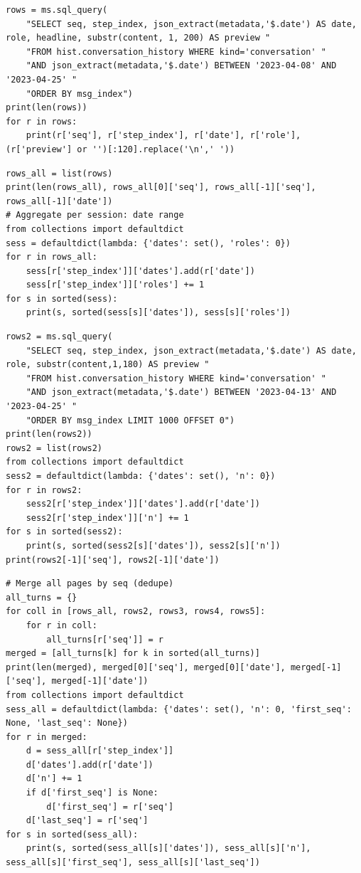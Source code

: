 \begin{lstlisting}[style=scroll, caption={Summarization: date-range SQL over event metadata (2023-04-08 to 2023-04-25).}, label={lst:sum-c0}]
rows = ms.sql_query(
    "SELECT seq, step_index, json_extract(metadata,'$.date') AS date, role, headline, substr(content, 1, 200) AS preview "
    "FROM hist.conversation_history WHERE kind='conversation' "
    "AND json_extract(metadata,'$.date') BETWEEN '2023-04-08' AND '2023-04-25' "
    "ORDER BY msg_index")
print(len(rows))
for r in rows:
    print(r['seq'], r['step_index'], r['date'], r['role'], (r['preview'] or '')[:120].replace('\n',' '))
\end{lstlisting}

\begin{lstlisting}[style=scroll, caption={Per-session aggregation of page 1 in the kernel.}, label={lst:sum-c1}]
rows_all = list(rows)
print(len(rows_all), rows_all[0]['seq'], rows_all[-1]['seq'], rows_all[-1]['date'])
# Aggregate per session: date range
from collections import defaultdict
sess = defaultdict(lambda: {'dates': set(), 'roles': 0})
for r in rows_all:
    sess[r['step_index']]['dates'].add(r['date'])
    sess[r['step_index']]['roles'] += 1
for s in sorted(sess):
    print(s, sorted(sess[s]['dates']), sess[s]['roles'])
\end{lstlisting}

\begin{lstlisting}[style=scroll, caption={Paging query; steps 3--5 rerun it changing only the \texttt{OFFSET}.}, label={lst:sum-c2}]
rows2 = ms.sql_query(
    "SELECT seq, step_index, json_extract(metadata,'$.date') AS date, role, substr(content,1,180) AS preview "
    "FROM hist.conversation_history WHERE kind='conversation' "
    "AND json_extract(metadata,'$.date') BETWEEN '2023-04-13' AND '2023-04-25' "
    "ORDER BY msg_index LIMIT 1000 OFFSET 0")
print(len(rows2))
rows2 = list(rows2)
from collections import defaultdict
sess2 = defaultdict(lambda: {'dates': set(), 'n': 0})
for r in rows2:
    sess2[r['step_index']]['dates'].add(r['date'])
    sess2[r['step_index']]['n'] += 1
for s in sorted(sess2):
    print(s, sorted(sess2[s]['dates']), sess2[s]['n'])
print(rows2[-1]['seq'], rows2[-1]['date'])
\end{lstlisting}

\begin{lstlisting}[style=scroll, caption={Kernel-side merge of all five pages, de-duplicated by \texttt{seq}.}, label={lst:sum-c6}]
# Merge all pages by seq (dedupe)
all_turns = {}
for coll in [rows_all, rows2, rows3, rows4, rows5]:
    for r in coll:
        all_turns[r['seq']] = r
merged = [all_turns[k] for k in sorted(all_turns)]
print(len(merged), merged[0]['seq'], merged[0]['date'], merged[-1]['seq'], merged[-1]['date'])
from collections import defaultdict
sess_all = defaultdict(lambda: {'dates': set(), 'n': 0, 'first_seq': None, 'last_seq': None})
for r in merged:
    d = sess_all[r['step_index']]
    d['dates'].add(r['date'])
    d['n'] += 1
    if d['first_seq'] is None:
        d['first_seq'] = r['seq']
    d['last_seq'] = r['seq']
for s in sorted(sess_all):
    print(s, sorted(sess_all[s]['dates']), sess_all[s]['n'], sess_all[s]['first_seq'], sess_all[s]['last_seq'])
\end{lstlisting}

